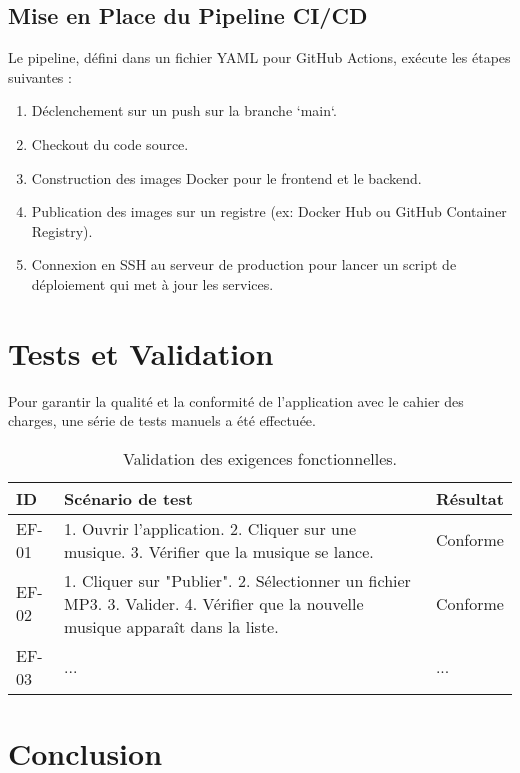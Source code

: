 \documentclass[12pt,a4paper]{article} %
\begin{document}
\subsection{Mise en Place du Pipeline CI/CD}
Le pipeline, défini dans un fichier YAML pour GitHub Actions, exécute les étapes suivantes :
\begin{enumerate}
    \item Déclenchement sur un push sur la branche `main`.
    \item Checkout du code source.
    \item Construction des images Docker pour le frontend et le backend.
    \item Publication des images sur un registre (ex: Docker Hub ou GitHub Container Registry).
    \item Connexion en SSH au serveur de production pour lancer un script de déploiement qui met à jour les services.
\end{enumerate}

\section{Tests et Validation}
Pour garantir la qualité et la conformité de l'application avec le cahier des charges, une série de tests manuels a été effectuée.

\begin{table}[h!]
    \centering
    \caption{Validation des exigences fonctionnelles.}
    \label{tab:validation}
    \begin{tabular}{@{}lp{}l@{}}
        \toprule
        \textbf{ID} & \textbf{Scénario de test} & \textbf{Résultat} \\
        \midrule
        EF-01 & 1. Ouvrir l'application. 2. Cliquer sur une musique. 3. Vérifier que la musique se lance. & Conforme \\
        EF-02 & 1. Cliquer sur "Publier". 2. Sélectionner un fichier MP3. 3. Valider. 4. Vérifier que la nouvelle musique apparaît dans la liste. & Conforme \\
        EF-03 & ... & ... \\
        \bottomrule
    \end{tabular}
\end{table}

\section{Conclusion}
\end{document}
